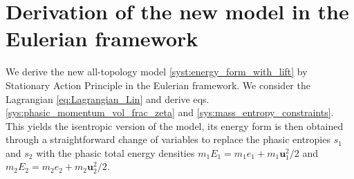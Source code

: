 \documentclass{myclass}
\newcommand{\vel}{\bm{u}}
\begin{document}
\section{Derivation of the new model in the  Eulerian framework}\label{app:derivation_eulerienne}
We derive the new all-topology model \eqref{syst:energy_form_with_lift} by Stationary Action Principle in the Eulerian framework. We consider the Lagrangian \eqref{eq:Lagrangian_Lin} and derive eqs. \eqref{sys:phasic_momentum_vol_frac_zeta} and \eqref{sys:mass_entropy_constraints}. This yields the isentropic version of the model, its energy form is then obtained through a straightforward change of variables to replace the phasic entropies $s_1$ and $s_2$ with the phasic total energy densities $m_1 E_1=m_1 e_1 + m_1\vel_1^2/2$ and $m_2 E_2=m_2 e_2 + m_2\vel_2^2/2$.
\end{document}

